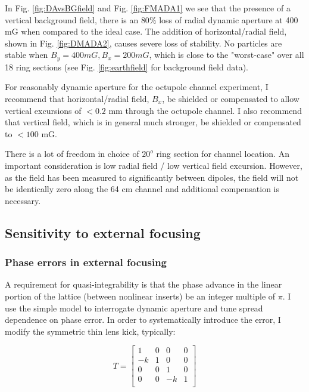 In Fig. \ref{fig:DAvsBGfield} and Fig. \ref{fig:FMADA1} we see that the presence of a vertical background field, there is an $80\%$ loss of radial dynamic aperture at 400 mG when compared to the ideal case. The addition of horizontal/radial field, shown in Fig. \ref{fig:DMADA2}, causes severe loss of stability. No particles are stable when $B_y=400 mG, B_x=200 mG$, which is close to the "worst-case" over all 18 ring sections (see Fig. \ref{fig:earthfield} for background field data). 

For reasonably dynamic aperture for the octupole channel experiment, I recommend that horizontal/radial field, $B_x$, be shielded or compensated to allow vertical excursions of $<0.2$ mm through the octupole channel. I also recommend that vertical field, which is in general much stronger, be shielded or compensated to $< 100$ mG. 

There is a lot of freedom in choice of $20^o$ ring section for channel location. An important consideration is low radial field / low vertical field excursion. However, as the field has been measured to significantly between dipoles, the field will not be identically zero along the 64 cm channel and additional compensation is necessary. 





\subsection{Sensitivity to external focusing}

\subsubsection{Phase errors in external focusing}

A requirement for quasi-integrability is that the phase advance in the linear portion of the lattice (between nonlinear inserts) be an integer multiple of $\pi$. I use the simple model to interrogate dynamic aperture and tune spread dependence on phase error. In order to systematically introduce the error, I modify the symmetric thin lens kick, typically:

\begin{equation}
T=
\begin{bmatrix} 
1 & 0 & 0 & 0 \\ 
-k & 1 & 0 & 0 \\ 
0 & 0 & 1 & 0 \\
0 & 0 & -k & 1 \\ 
\end{bmatrix}
\end{equation}

